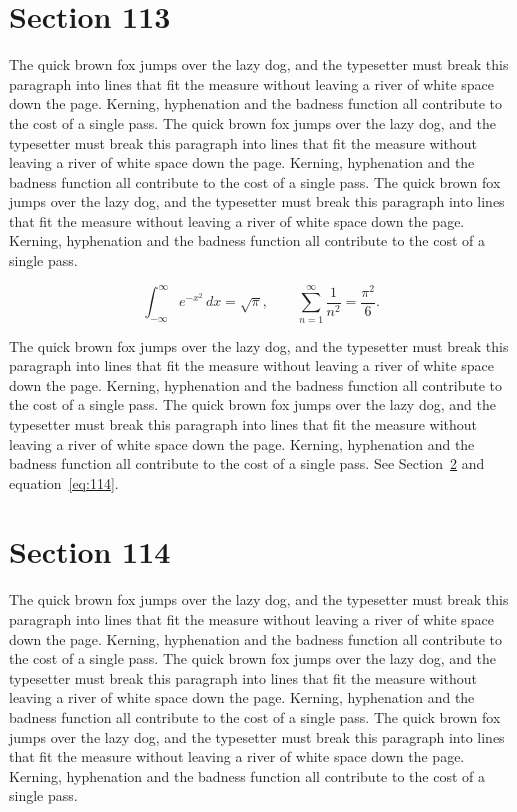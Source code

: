 \documentclass{article}
\begin{document}
\section{Section 113}
\label{sec:113}
The quick brown fox jumps over the lazy dog, and the typesetter must break this paragraph into lines that fit the measure without leaving a river of white space down the page. Kerning, hyphenation and the badness function all contribute to the cost of a single pass. The quick brown fox jumps over the lazy dog, and the typesetter must break this paragraph into lines that fit the measure without leaving a river of white space down the page. Kerning, hyphenation and the badness function all contribute to the cost of a single pass. The quick brown fox jumps over the lazy dog, and the typesetter must break this paragraph into lines that fit the measure without leaving a river of white space down the page. Kerning, hyphenation and the badness function all contribute to the cost of a single pass. 

\begin{equation}\label{eq:113}
\int_{-\infty}^{\infty} e^{-x^{2}}\,dx = \sqrt{\pi}, \qquad
\sum_{n=1}^{\infty} \frac{1}{n^{2}} = \frac{\pi^{2}}{6}.
\end{equation}

The quick brown fox jumps over the lazy dog, and the typesetter must break this paragraph into lines that fit the measure without leaving a river of white space down the page. Kerning, hyphenation and the badness function all contribute to the cost of a single pass. The quick brown fox jumps over the lazy dog, and the typesetter must break this paragraph into lines that fit the measure without leaving a river of white space down the page. Kerning, hyphenation and the badness function all contribute to the cost of a single pass. 
See Section~\ref{sec:114} and equation~\eqref{eq:114}.
\section{Section 114}
\label{sec:114}
The quick brown fox jumps over the lazy dog, and the typesetter must break this paragraph into lines that fit the measure without leaving a river of white space down the page. Kerning, hyphenation and the badness function all contribute to the cost of a single pass. The quick brown fox jumps over the lazy dog, and the typesetter must break this paragraph into lines that fit the measure without leaving a river of white space down the page. Kerning, hyphenation and the badness function all contribute to the cost of a single pass. The quick brown fox jumps over the lazy dog, and the typesetter must break this paragraph into lines that fit the measure without leaving a river of white space down the page. Kerning, hyphenation and the badness function all contribute to the cost of a single pass. 
\end{document}
